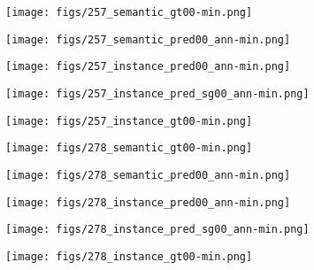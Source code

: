 \documentclass[10pt,twocolumn,letterpaper]{article}
\begin{document}
	\begin{figure*}
		\centering
		\begin{subfigure}{0.195\textwidth}
			\texttt{[image: figs/257\_semantic\_gt00-min.png]}
		\end{subfigure}
		\begin{subfigure}{0.195\textwidth}
			\texttt{[image: figs/257\_semantic\_pred00\_ann-min.png]}
		\end{subfigure}
		\begin{subfigure}{0.195\textwidth}
			\texttt{[image: figs/257\_instance\_pred00\_ann-min.png]}
		\end{subfigure}
		\begin{subfigure}{0.195\textwidth}
			\texttt{[image: figs/257\_instance\_pred\_sg00\_ann-min.png]}
		\end{subfigure}
		\begin{subfigure}{0.195\textwidth}
			\texttt{[image: figs/257\_instance\_gt00-min.png]}
		\end{subfigure}
		
		\begin{subfigure}{0.195\textwidth}
			\texttt{[image: figs/278\_semantic\_gt00-min.png]}
		\end{subfigure}
		\begin{subfigure}{0.195\textwidth}
			\texttt{[image: figs/278\_semantic\_pred00\_ann-min.png]}
		\end{subfigure}
		\begin{subfigure}{0.195\textwidth}
			\texttt{[image: figs/278\_instance\_pred00\_ann-min.png]}
		\end{subfigure}
		\begin{subfigure}{0.195\textwidth}
			\texttt{[image: figs/278\_instance\_pred\_sg00\_ann-min.png]}
		\end{subfigure}
		\begin{subfigure}{0.195\textwidth}
			\texttt{[image: figs/278\_instance\_gt00-min.png]}
		\end{subfigure}
		

\end{figure*}
\end{document}
